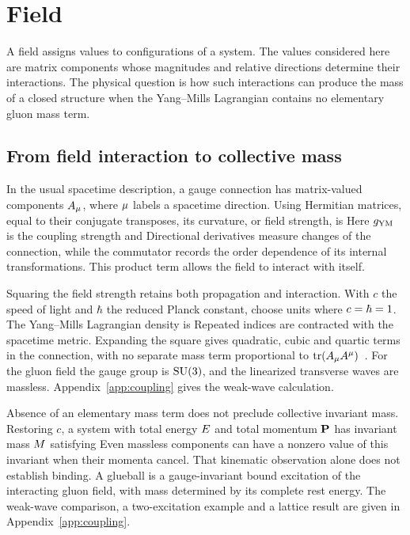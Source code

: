 \section{Field}
\label{sec:field}
A field assigns values to configurations of a system. The values considered here are matrix components whose magnitudes and relative directions determine their interactions. The physical question is how such interactions can produce the mass of a closed structure when the Yang--Mills Lagrangian contains no elementary gluon mass term.

\subsection{From field interaction to collective mass}
In the usual spacetime description, a gauge connection has matrix-valued components $A_\mu$, where $\mu$ labels a spacetime direction. Using Hermitian matrices, equal to their conjugate transposes, its curvature, or field strength, is
\FieldYMStrengthDisplay
Here $g_{\mathrm{YM}}$ is the coupling strength and
\FieldYMCommutatorDisplay
Directional derivatives measure changes of the connection, while the commutator records the order dependence of its internal transformations. This product term allows the field to interact with itself.

Squaring the field strength retains both propagation and interaction. With $c$ the speed of light and $\hbar$ the reduced Planck constant, choose units where $c=\hbar=1$. The Yang--Mills Lagrangian density is
\FieldYMLagrangianDisplay
Repeated indices are contracted with the spacetime metric. Expanding the square gives quadratic, cubic and quartic terms in the connection, with no separate mass term proportional to $\operatorname{tr}(A_\mu A^\mu)$~\cite{yangMills1954}. For the gluon field the gauge group is $\mathrm{SU}(3)$, and the linearized transverse waves are massless. Appendix~\ref{app:coupling} gives the weak-wave calculation.

Absence of an elementary mass term does not preclude collective invariant mass. Restoring $c$, a system with total energy $E$ and total momentum $\mathbf P$ has invariant mass $M$ satisfying
\FieldYMInvariantMassDisplay
Even massless components can have a nonzero value of this invariant when their momenta cancel. That kinematic observation alone does not establish binding. A glueball is a gauge-invariant bound excitation of the interacting gluon field, with mass determined by its complete rest energy. The weak-wave comparison, a two-excitation example and a lattice result are given in Appendix~\ref{app:coupling}.

